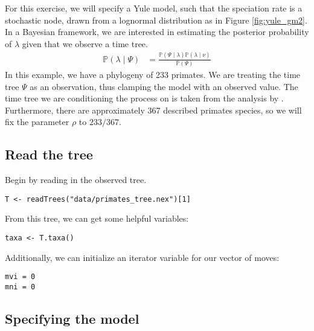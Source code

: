 For this exercise, we will specify a Yule model, such that the speciation rate is a stochastic node, drawn from a lognormal distribution as in Figure \ref{fig:yule_gm2}.
In a Bayesian framework, we are interested in estimating the posterior probability of $\lambda$ given that we observe a time tree.
\begin{align}\label{bayesTher}
\mathbb{P}(\lambda \mid \Psi) &= \frac{\mathbb{P}(\Psi \mid \lambda)\mathbb{P}(\lambda \mid \nu)}{\mathbb{P}(\Psi)}
\end{align}
In this example, we have a phylogeny of 233 primates.
We are treating the time tree $\Psi$ as an observation, thus clamping the model with an observed value.
The time tree we are conditioning the process on is taken from the analysis by \citet{MagnusonFord2012}.
Furthermore, there are approximately 367 described primates species, so we will fix the parameter $\rho$ to $233/367$.



\subsection{Read the tree}

Begin by reading in the observed tree.

{\tt \begin{snugshade*}
\begin{lstlisting}
T <- readTrees("data/primates_tree.nex")[1]
\end{lstlisting}
\end{snugshade*}}

From this tree, we can get some helpful variables:
{\tt \begin{snugshade*}
\begin{lstlisting}
taxa <- T.taxa()
\end{lstlisting}
\end{snugshade*}}

Additionally, we can initialize an iterator variable for our vector of moves:
{\tt \begin{snugshade*}
\begin{lstlisting}
mvi = 0
mni = 0
\end{lstlisting}
\end{snugshade*}}


\subsection{Specifying the model}

